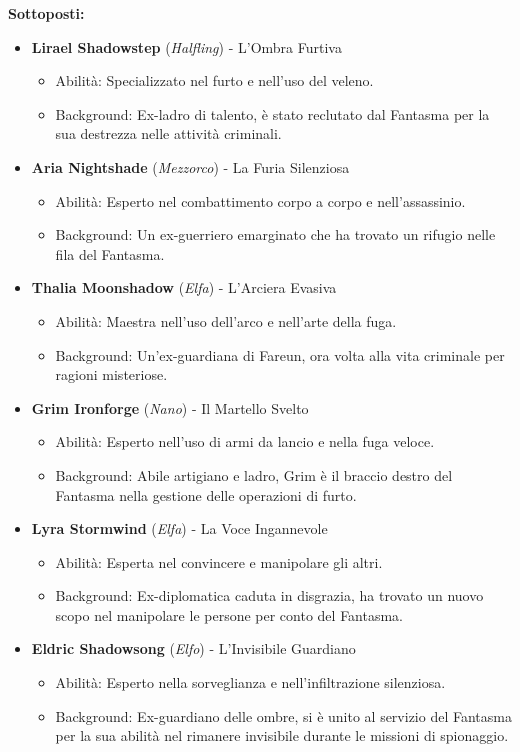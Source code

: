 \documentclass{article}
\begin{document}
\textbf{Sottoposti:}
\begin{itemize}
  \item \textbf{Lirael Shadowstep} (\textit{Halfling}) - L'Ombra Furtiva
    \begin{itemize}
      \item Abilità: Specializzato nel furto e nell'uso del veleno.
      \item Background: Ex-ladro di talento, è stato reclutato dal Fantasma per la sua destrezza nelle attività criminali.
    \end{itemize}

  \item \textbf{Aria Nightshade} (\textit{Mezzorco}) - La Furia Silenziosa
    \begin{itemize}
      \item Abilità: Esperto nel combattimento corpo a corpo e nell'assassinio.
      \item Background: Un ex-guerriero emarginato che ha trovato un rifugio nelle fila del Fantasma.
    \end{itemize}

  \item \textbf{Thalia Moonshadow} (\textit{Elfa}) - L'Arciera Evasiva
    \begin{itemize}
      \item Abilità: Maestra nell'uso dell'arco e nell'arte della fuga.
      \item Background: Un'ex-guardiana di Fareun, ora volta alla vita criminale per ragioni misteriose.
    \end{itemize}

  \item \textbf{Grim Ironforge} (\textit{Nano}) - Il Martello Svelto
    \begin{itemize}
      \item Abilità: Esperto nell'uso di armi da lancio e nella fuga veloce.
      \item Background: Abile artigiano e ladro, Grim è il braccio destro del Fantasma nella gestione delle operazioni di furto.
    \end{itemize}

  \item \textbf{Lyra Stormwind} (\textit{Elfa}) - La Voce Ingannevole
    \begin{itemize}
      \item Abilità: Esperta nel convincere e manipolare gli altri.
      \item Background: Ex-diplomatica caduta in disgrazia, ha trovato un nuovo scopo nel manipolare le persone per conto del Fantasma.
    \end{itemize}
    \item \textbf{Eldric Shadowsong} (\textit{Elfo}) - L'Invisibile Guardiano
  \begin{itemize}
    \item Abilità: Esperto nella sorveglianza e nell'infiltrazione silenziosa.
    \item Background: Ex-guardiano delle ombre, si è unito al servizio del Fantasma per la sua abilità nel rimanere invisibile durante le missioni di spionaggio.
  \end{itemize}


\end{itemize}
\end{document}
